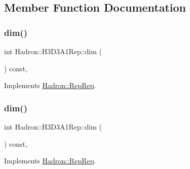 \subsection{Member Function Documentation}
\mbox{\label{structHadron_1_1H3D3A1Rep_ac7d5289dfab1007d156e2eef2b159026}} 
\subsubsection{\texorpdfstring{dim()}{dim()}\hspace{0.1cm}{\footnotesize\ttfamily [1/5]}}
{\footnotesize\ttfamily int Hadron\+::\+H3\+D3\+A1\+Rep\+::dim (\begin{DoxyParamCaption}{ }\end{DoxyParamCaption}) const\hspace{0.3cm}{\ttfamily [inline]}, {\ttfamily [virtual]}}



Implements \mbox{\hyperlink{structHadron_1_1RepRep_a92c8802e5ed7afd7da43ccfd5b7cd92b}{Hadron\+::\+Rep\+Rep}}.

\mbox{\label{structHadron_1_1H3D3A1Rep_ac7d5289dfab1007d156e2eef2b159026}} 
\subsubsection{\texorpdfstring{dim()}{dim()}\hspace{0.1cm}{\footnotesize\ttfamily [2/5]}}
{\footnotesize\ttfamily int Hadron\+::\+H3\+D3\+A1\+Rep\+::dim (\begin{DoxyParamCaption}{ }\end{DoxyParamCaption}) const\hspace{0.3cm}{\ttfamily [inline]}, {\ttfamily [virtual]}}



Implements \mbox{\hyperlink{structHadron_1_1RepRep_a92c8802e5ed7afd7da43ccfd5b7cd92b}{Hadron\+::\+Rep\+Rep}}.

\mbox{\label{structHadron_1_1H3D3A1Rep_ac7d5289dfab1007d156e2eef2b159026}} 

